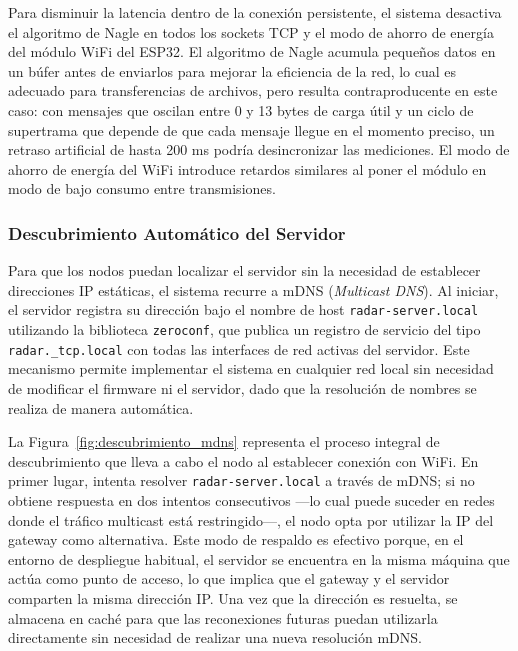 Para disminuir la latencia dentro de la conexión persistente, el sistema desactiva el algoritmo de Nagle en todos los sockets TCP y el modo de ahorro de energía del módulo WiFi del ESP32. El algoritmo de Nagle acumula pequeños datos en un búfer antes de enviarlos para mejorar la eficiencia de la red, lo cual es adecuado para transferencias de archivos, pero resulta contraproducente en este caso: con mensajes que oscilan entre 0 y 13 bytes de carga útil y un ciclo de supertrama que depende de que cada mensaje llegue en el momento preciso, un retraso artificial de hasta 200 ms podría desincronizar las mediciones. El modo de ahorro de energía del WiFi introduce retardos similares al poner el módulo en modo de bajo consumo entre transmisiones.


\subsubsection*{Descubrimiento Automático del Servidor}

Para que los nodos puedan localizar el servidor sin la necesidad de establecer direcciones IP estáticas, el sistema recurre a mDNS (\textit{Multicast DNS}). Al iniciar, el servidor registra su dirección bajo el nombre de host \texttt{radar-server.local} utilizando la biblioteca \texttt{zeroconf}, que publica un registro de servicio del tipo \texttt{radar.\_tcp.local} con todas las interfaces de red activas del servidor. Este mecanismo permite implementar el sistema en cualquier red local sin necesidad de modificar el firmware ni el servidor, dado que la resolución de nombres se realiza de manera automática.

La Figura~\ref{fig:descubrimiento_mdns} representa el proceso integral de descubrimiento que lleva a cabo el nodo al establecer conexión con WiFi. En primer lugar, intenta resolver \texttt{radar-server.local} a través de mDNS; si no obtiene respuesta en dos intentos consecutivos ---lo cual puede suceder en redes donde el tráfico multicast está restringido---, el nodo opta por utilizar la IP del gateway como alternativa. Este modo de respaldo es efectivo porque, en el entorno de despliegue habitual, el servidor se encuentra en la misma máquina que actúa como punto de acceso, lo que implica que el gateway y el servidor comparten la misma dirección IP. Una vez que la dirección es resuelta, se almacena en caché para que las reconexiones futuras puedan utilizarla directamente sin necesidad de realizar una nueva resolución mDNS.

